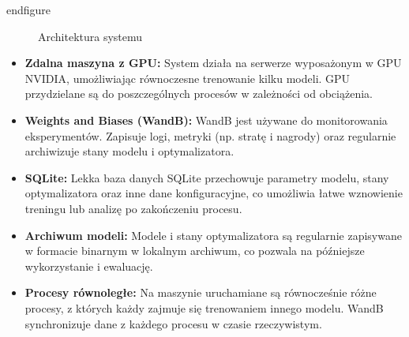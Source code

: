 end{figure}
\begin{figure}[!ht]
	\centering

	\label{fig:system_architecture}
	\caption{Architektura systemu}
\end{figure}

\begin{itemize}
	\item \textbf{Zdalna maszyna z GPU:} System działa na serwerze wyposażonym w GPU NVIDIA, umożliwiając równoczesne trenowanie kilku modeli. GPU przydzielane są do poszczególnych procesów w zależności od obciążenia.
	\item \textbf{Weights and Biases (WandB):} WandB jest używane do monitorowania eksperymentów. Zapisuje logi, metryki (np. stratę i nagrody) oraz regularnie archiwizuje stany modelu i optymalizatora.
	\item \textbf{SQLite:} Lekka baza danych SQLite przechowuje parametry modelu, stany optymalizatora oraz inne dane konfiguracyjne, co umożliwia łatwe wznowienie treningu lub analizę po zakończeniu procesu.
	\item \textbf{Archiwum modeli:} Modele i stany optymalizatora są regularnie zapisywane w formacie binarnym w lokalnym archiwum, co pozwala na późniejsze wykorzystanie i ewaluację.
	\item \textbf{Procesy równoległe:} Na maszynie uruchamiane są równocześnie różne procesy, z których każdy zajmuje się trenowaniem innego modelu. WandB synchronizuje dane z każdego procesu w czasie rzeczywistym.
\end{itemize}


